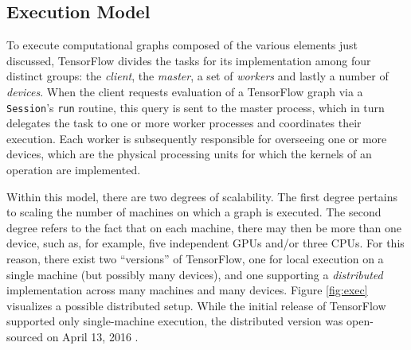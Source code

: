 \subsection{Execution Model}\label{sec:model-exec}

To execute computational graphs composed of the various elements just discussed,
TensorFlow divides the tasks for its implementation among four distinct groups:
the \emph{client}, the \emph{master}, a set of \emph{workers} and lastly a
number of \emph{devices}. When the client requests evaluation of a TensorFlow
graph via a \texttt{Session}'s \texttt{run} routine, this query is sent to the
master process, which in turn delegates the task to one or more worker processes
and coordinates their execution. Each worker is subsequently responsible for
overseeing one or more devices, which are the physical processing units for
which the kernels of an operation are implemented.

Within this model, there are two degrees of scalability. The first degree
pertains to scaling the number of machines on which a graph is executed. The
second degree refers to the fact that on each machine, there may then be more
than one device, such as, for example, five independent GPUs and/or three
CPUs. For this reason, there exist two ``versions'' of TensorFlow, one for local
execution on a single machine (but possibly many devices), and one supporting a
\emph{distributed} implementation across many machines and many devices. Figure
\ref{fig:exec} visualizes a possible distributed setup. While the initial
release of TensorFlow supported only single-machine execution, the distributed
version was open-sourced on April 13, 2016 \cite{tensorflowdist}.

